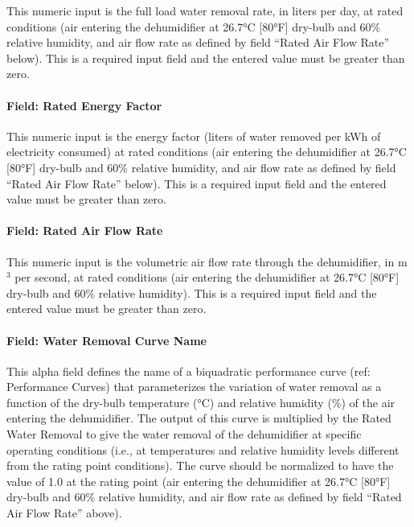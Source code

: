This numeric input is the full load water removal rate, in liters per day, at rated conditions (air entering the dehumidifier at 26.7°C {[}80°F{]} dry-bulb and 60\% relative humidity, and air flow rate as defined by field ``Rated Air Flow Rate'' below). This is a required input field and the entered value must be greater than zero.

\paragraph{Field: Rated Energy Factor}\label{field-rated-energy-factor}

This numeric input is the energy factor (liters of water removed per kWh of electricity consumed) at rated conditions (air entering the dehumidifier at 26.7°C {[}80°F{]} dry-bulb and 60\% relative humidity, and air flow rate as defined by field ``Rated Air Flow Rate'' below). This is a required input field and the entered value must be greater than zero.

\paragraph{Field: Rated Air Flow Rate}\label{field-rated-air-flow-rate-001}

This numeric input is the volumetric air flow rate through the dehumidifier, in m\(^{3}\) per second, at rated conditions (air entering the dehumidifier at 26.7°C {[}80°F{]} dry-bulb and 60\% relative humidity). This is a required input field and the entered value must be greater than zero.

\paragraph{Field: Water Removal Curve Name}\label{field-water-removal-curve-name}

This alpha field defines the name of a biquadratic performance curve (ref: Performance Curves) that parameterizes the variation of water removal as a function of the dry-bulb temperature (°C) and relative humidity (\%) of the air entering the dehumidifier. The output of this curve is multiplied by the Rated Water Removal to give the water removal of the dehumidifier at specific operating conditions (i.e., at temperatures and relative humidity levels different from the rating point conditions). The curve should be normalized to have the value of 1.0 at the rating point (air entering the dehumidifier at 26.7°C {[}80°F{]} dry-bulb and 60\% relative humidity, and air flow rate as defined by field ``Rated Air Flow Rate'' above).

